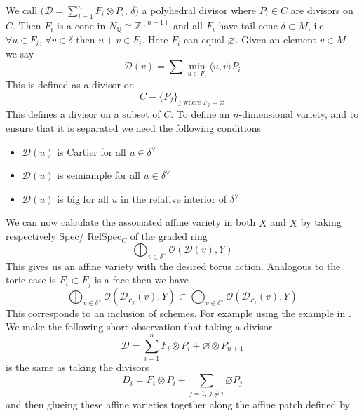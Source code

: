 \documentclass[11pt]{amsart}
\theoremstyle{definition}
\theoremstyle{definition}
\theoremstyle{definition}
\theoremstyle{definition}
\theoremstyle{definition}
\theoremstyle{definition}
\theoremstyle{definition}
\begin{document}
We call $(\mathcal{D} = \sum_{i = 1}^n F_i \otimes P_i$, $\delta)$ a polyhedral divisor where $P_i \in C$ are divisors on $C$. Then $F_i$ is a cone in $N_\mathbb{Q} \cong \mathbb{Z}^{(n-1)}$ and all $F_i$ have tail cone $\delta \subset M$, i.e  $\forall u \in F_i$, $ \forall v \in \delta$ then $u+v \in F_i$. Here $F_i$ can equal $\varnothing$. Given an element $v \in M$ we say 
\[
\mathcal{D}(v) = \sum \min_{u \in F_i} \langle u, v \rangle P_i
\]
This is defined as a divisor on 
\[
C - \{P_j\}_{j \text{ where } F_j = \varnothing}
\]
This defines a divisor on a subset of $C$. To define an $n$-dimensional variety, and to ensure that it is separated we need the following conditions \cite{PS}
\begin{itemize} 
\item $\mathcal{D}(u)$ is Cartier for all $u \in \delta^\vee $
\item $\mathcal{D}(u)$ is semiample for all $u \in \delta^\vee$
\item $\mathcal{D}(u)$ is big for all $u$ in the relative interior of $\delta^\vee$
\end{itemize}
We can now calculate the associated affine variety in both $X$ and $\tilde{X}$ by taking respectively Spec/ RelSpec${_C}$ of the graded ring
\[
\bigoplus_{v \in \delta^\vee} \mathcal{O}( \mathcal{D}(v), Y) 
\]
This gives us an affine variety with the desired torus action. Analogous to the toric case is $F_i \subset F_j$ is a face then we have
\[
\bigoplus_{v \in \delta^\vee} \mathcal{O}( \mathcal{D}_{F_j}(v), Y) \subset \bigoplus_{v \in \delta^\vee} \mathcal{O}( \mathcal{D}_{F_i}(v), Y) 
\]
This corresponds to an inclusion of schemes. For example using the example in \cite{PS}. We make the following short observation that taking a divisor 
\[ 
\mathcal{D} = \sum_{i = 1}^n F_i \otimes P_i + \varnothing \otimes P_{n+1}
\]
is the same as taking the divisors 
\[
D_i = F_i \otimes P_i  + \sum_{j=1, \, j \neq i} \varnothing P_j
\]
and then glueing these affine varieties together along the affine patch defined by 
\end{document}
